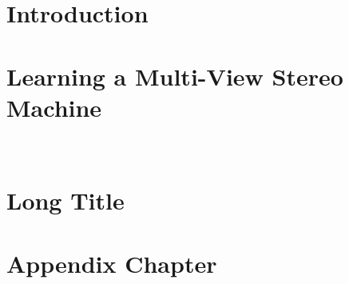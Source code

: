 \documentclass[12pt, oneside]{lib/ucthesis}
\def\ssp{\def\baselinestretch{1.0}\large\normalsize}
\begin{document}
\tableofcontents
\listoffigures 
\listoftables

\begin{acknowledgements}
\thispagestyle{plain}
\end{acknowledgements}




\begin{dissertationText}
\chapter{Introduction}
	
\chapter{Learning a Multi-View Stereo Machine}~\label{chapter:LSM}
	
\chapter[Short Title]{Long Title}
	

\ssp	%



\appendix
\chapter{Appendix Chapter}~\label{sec:appendix-pf}
	

\end{dissertationText}
\end{document}
